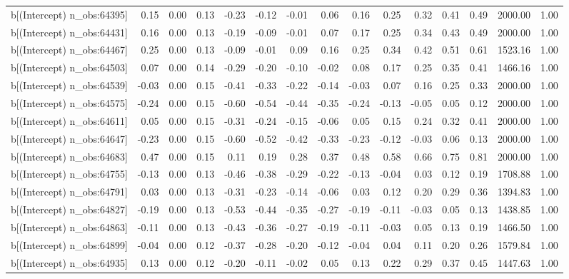 \begin{table}[ht]
\begin{tabular}{rrrrrrrrrrrrrrr}
  b[(Intercept) n\_obs:64395] & 0.15 & 0.00 & 0.13 & -0.23 & -0.12 & -0.01 & 0.06 & 0.16 & 0.25 & 0.32 & 0.41 & 0.49 & 2000.00 & 1.00 \\ 
  b[(Intercept) n\_obs:64431] & 0.16 & 0.00 & 0.13 & -0.19 & -0.09 & -0.01 & 0.07 & 0.17 & 0.25 & 0.34 & 0.43 & 0.49 & 2000.00 & 1.00 \\ 
  b[(Intercept) n\_obs:64467] & 0.25 & 0.00 & 0.13 & -0.09 & -0.01 & 0.09 & 0.16 & 0.25 & 0.34 & 0.42 & 0.51 & 0.61 & 1523.16 & 1.00 \\ 
  b[(Intercept) n\_obs:64503] & 0.07 & 0.00 & 0.14 & -0.29 & -0.20 & -0.10 & -0.02 & 0.08 & 0.17 & 0.25 & 0.35 & 0.41 & 1466.16 & 1.00 \\ 
  b[(Intercept) n\_obs:64539] & -0.03 & 0.00 & 0.15 & -0.41 & -0.33 & -0.22 & -0.14 & -0.03 & 0.07 & 0.16 & 0.25 & 0.33 & 2000.00 & 1.00 \\ 
  b[(Intercept) n\_obs:64575] & -0.24 & 0.00 & 0.15 & -0.60 & -0.54 & -0.44 & -0.35 & -0.24 & -0.13 & -0.05 & 0.05 & 0.12 & 2000.00 & 1.00 \\ 
  b[(Intercept) n\_obs:64611] & 0.05 & 0.00 & 0.15 & -0.31 & -0.24 & -0.15 & -0.06 & 0.05 & 0.15 & 0.24 & 0.32 & 0.41 & 2000.00 & 1.00 \\ 
  b[(Intercept) n\_obs:64647] & -0.23 & 0.00 & 0.15 & -0.60 & -0.52 & -0.42 & -0.33 & -0.23 & -0.12 & -0.03 & 0.06 & 0.13 & 2000.00 & 1.00 \\ 
  b[(Intercept) n\_obs:64683] & 0.47 & 0.00 & 0.15 & 0.11 & 0.19 & 0.28 & 0.37 & 0.48 & 0.58 & 0.66 & 0.75 & 0.81 & 2000.00 & 1.00 \\ 
  b[(Intercept) n\_obs:64755] & -0.13 & 0.00 & 0.13 & -0.46 & -0.38 & -0.29 & -0.22 & -0.13 & -0.04 & 0.03 & 0.12 & 0.19 & 1708.88 & 1.00 \\ 
  b[(Intercept) n\_obs:64791] & 0.03 & 0.00 & 0.13 & -0.31 & -0.23 & -0.14 & -0.06 & 0.03 & 0.12 & 0.20 & 0.29 & 0.36 & 1394.83 & 1.00 \\ 
  b[(Intercept) n\_obs:64827] & -0.19 & 0.00 & 0.13 & -0.53 & -0.44 & -0.35 & -0.27 & -0.19 & -0.11 & -0.03 & 0.05 & 0.13 & 1438.85 & 1.00 \\ 
  b[(Intercept) n\_obs:64863] & -0.11 & 0.00 & 0.13 & -0.43 & -0.36 & -0.27 & -0.19 & -0.11 & -0.03 & 0.05 & 0.13 & 0.19 & 1466.50 & 1.00 \\ 
  b[(Intercept) n\_obs:64899] & -0.04 & 0.00 & 0.12 & -0.37 & -0.28 & -0.20 & -0.12 & -0.04 & 0.04 & 0.11 & 0.20 & 0.26 & 1579.84 & 1.00 \\ 
  b[(Intercept) n\_obs:64935] & 0.13 & 0.00 & 0.12 & -0.20 & -0.11 & -0.02 & 0.05 & 0.13 & 0.22 & 0.29 & 0.37 & 0.45 & 1447.63 & 1.00 \\ 

\end{tabular}
\end{table}
